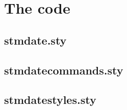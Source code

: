 \documentclass{scrartcl}
\begin{document}
\newpage
\appendix

\section{The code}

\subsection{stmdate.sty}



\newpage
\subsection{stmdatecommands.sty}



\newpage
\subsection{stmdatestyles.sty}


\end{document}
